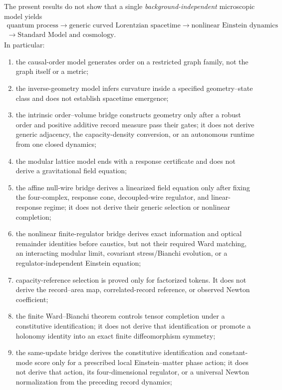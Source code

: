 The present results do not show that a single \emph{background-independent}
microscopic model yields
\[
\begin{gathered}
\text{quantum process}\to\text{generic curved Lorentzian spacetime}
\to\text{nonlinear Einstein dynamics}\\
\to\text{Standard Model and cosmology}.
\end{gathered}
\]
In particular:
\begin{enumerate}
\item the causal-order model generates order on a restricted graph family,
not the graph itself or a metric;
\item the inverse-geometry model infers curvature inside a specified
geometry--state class and does not establish spacetime emergence;
\item the intrinsic order--volume bridge constructs geometry only after a
robust order and positive additive record measure pass their gates; it does
not derive generic adjacency, the capacity-density conversion, or an
autonomous runtime from one closed dynamics;
\item the modular lattice model ends with a response certificate and does not
derive a gravitational field equation;
\item the affine null-wire bridge derives a linearized field equation only
after fixing the four-complex, response cone, decoupled-wire regulator, and
linear-response regime; it does not derive their generic selection or
nonlinear completion;
\item the nonlinear finite-regulator bridge derives exact information and
optical remainder identities before caustics, but not their required Ward
matching, an interacting modular limit, covariant stress/Bianchi evolution,
or a regulator-independent Einstein equation;
\item capacity-reference selection is proved only for factorized tokens.  It
does not derive the record--area map, correlated-record reference, or
observed Newton coefficient;
\item the finite Ward--Bianchi theorem controls tensor completion under a
constitutive identification; it does not derive that identification or
promote a holonomy identity into an exact finite diffeomorphism symmetry;
\item the same-update bridge derives the constitutive identification and
constant-mode score only for a prescribed local Einstein--matter phase
action; it does not derive that action, its four-dimensional regulator, or a
universal Newton normalization from the preceding record dynamics;

\end{enumerate}
